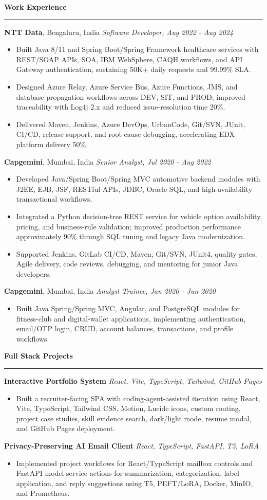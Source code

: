 \documentclass[10pt,letterpaper]{article}
\newcommand{\ressection}[1]{\vspace{2.6pt}\par\textbf{#1}\par\vspace{0.8pt}\hrule\vspace{1.6pt}}
\begin{document}
\ressection{Work Experience}
\textbf{NTT Data}, Bengaluru, India \hfill \textit{Software Developer, Aug 2022 - Aug 2024}
\begin{itemize}
  \item Built Java 8/11 and Spring Boot/Spring Framework healthcare services with REST/SOAP APIs, SOA, IBM WebSphere, CAQH workflows, and API Gateway authentication, sustaining 50K+ daily requests and 99.99\% SLA.
  \item Designed Azure Relay, Azure Service Bus, Azure Functions, JMS, and database-propagation workflows across DEV, SIT, and PROD; improved traceability with Log4j 2.x and reduced issue-resolution time 20\%.
  \item Delivered Maven, Jenkins, Azure DevOps, UrbanCode, Git/SVN, JUnit, CI/CD, release support, and root-cause debugging, accelerating EDX platform delivery 50\%.
\end{itemize}
\textbf{Capgemini}, Mumbai, India \hfill \textit{Senior Analyst, Jul 2020 - Aug 2022}
\begin{itemize}
  \item Developed Java/Spring Boot/Spring MVC automotive backend modules with J2EE, EJB, JSF, RESTful APIs, JDBC, Oracle SQL, and high-availability transactional workflows.
  \item Integrated a Python decision-tree REST service for vehicle option availability, pricing, and business-rule validation; improved production performance approximately 90\% through SQL tuning and legacy Java modernization.
  \item Supported Jenkins, GitLab CI/CD, Maven, Git/SVN, JUnit4, quality gates, Agile delivery, code reviews, debugging, and mentoring for junior Java developers.
\end{itemize}
\textbf{Capgemini}, Mumbai, India \hfill \textit{Analyst Trainee, Jan 2020 - Jun 2020}
\begin{itemize}
  \item Built Java Spring/Spring MVC, Angular, and PostgreSQL modules for fitness-club and digital-wallet applications, implementing authentication, email/OTP login, CRUD, account balances, transactions, and profile workflows.
\end{itemize}

\ressection{Full Stack Projects}
\textbf{Interactive Portfolio System} \hfill \textit{React, Vite, TypeScript, Tailwind, GitHub Pages}
\begin{itemize}
  \item Built a recruiter-facing SPA with coding-agent-assisted iteration using React, Vite, TypeScript, Tailwind CSS, Motion, Lucide icons, custom routing, project case studies, skill evidence search, dark/light mode, resume modal, and GitHub Pages deployment.
\end{itemize}
\textbf{Privacy-Preserving AI Email Client} \hfill \textit{React, TypeScript, FastAPI, T5, LoRA}
\begin{itemize}
  \item Implemented project workflows for React/TypeScript mailbox controls and FastAPI model-service actions for summarization, categorization, label application, and reply suggestions using T5, PEFT/LoRA, Docker, MinIO, and Prometheus.
\end{itemize}
\end{document}
